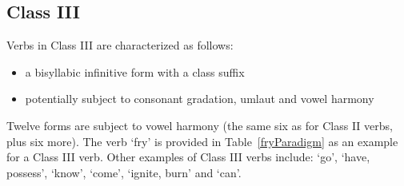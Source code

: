 \subsection{Class III}\label{VclassIII}
Verbs in Class III are characterized as follows:
\begin{itemize}
\item{a bisyllabic infinitive form with a class suffix }
\item{potentially subject to consonant gradation, umlaut and vowel harmony}
\end{itemize}
Twelve forms are subject to vowel harmony (the same six as for Class II verbs, plus six more). 
The verb  ‘fry’ is provided in Table~\vref{fryParadigm} as an example for a Class III verb. Other examples of Class III verbs include:  ‘go’,  ‘have, possess’,  ‘know’,  ‘come’,  ‘ignite, burn’ and  ‘can’. 
